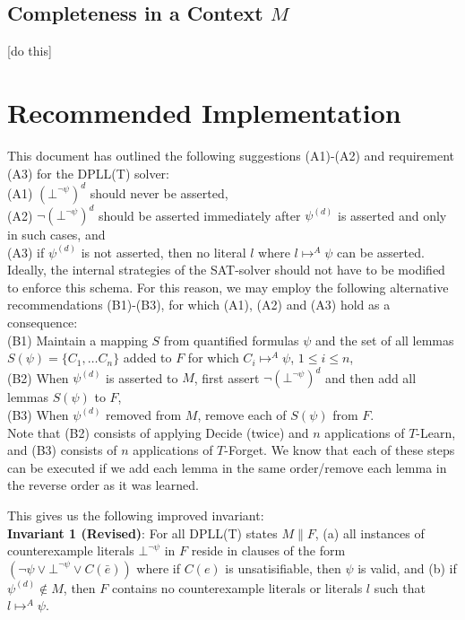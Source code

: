 \documentclass{llncs}
\begin{document}
\subsection{Completeness in a Context $M$}

[do this]

\section{Recommended Implementation}
\label{sec:implementation}

This document has outlined the following suggestions (A1)-(A2) and requirement (A3) for the DPLL(T) solver: \\

\noindent (A1) $(\bot^{\neg \psi})^d$ should never be asserted, \\
(A2) $\neg (\bot^{\neg \psi})^d$ should be asserted immediately after $\psi^{(d)}$ is asserted and only in such cases, and \\
(A3) if $\psi^{(d)}$ is not asserted, then no literal $l$ where $l \mapsto^A \psi$ can be asserted. \\

Ideally, the internal strategies of the SAT-solver should not have to be modified to enforce this schema.
For this reason, we may employ the following alternative recommendations (B1)-(B3), for which (A1), (A2) and (A3) hold as a consequence: \\

\noindent (B1) Maintain a mapping $S$ from quantified formulas $\psi$ and the set of all lemmas $S(\psi) = \{ C_1, \ldots C_n \}$ added to $F$ for which $C_i \mapsto^A \psi$, $1 \leq i \leq n$, \\
(B2) When $\psi^{(d)}$ is asserted to $M$, first assert $\neg (\bot^{\neg \psi})^d$ and then add all lemmas $S(\psi)$ to $F$, \\
(B3) When $\psi^{(d)}$ removed from $M$, remove each of $S(\psi)$ from $F$. \\

Note that (B2) consists of applying Decide (twice) and $n$ applications of $T$-Learn, and (B3) consists of $n$ applications of $T$-Forget.
We know that each of these steps can be executed if we add each lemma in the same order/remove each lemma in the reverse order as it was learned.

This gives us the following improved invariant: \\

{\bf Invariant 1 (Revised)}:
For all DPLL(T) states $M \parallel F$,
(a) all instances of counterexample literals $\bot^{\neg \psi}$ in $F$ reside in clauses of the form $( \neg \psi \vee \bot^{\neg \psi} \vee C(\bar{e}) )$ where if $C(e)$ is unsatisifiable, then $\psi$ is valid, and
(b) if $\psi^{(d)} \not\in M$, then $F$ contains no counterexample literals or literals $l$ such that $l \mapsto^A \psi$. \\
\end{document}
